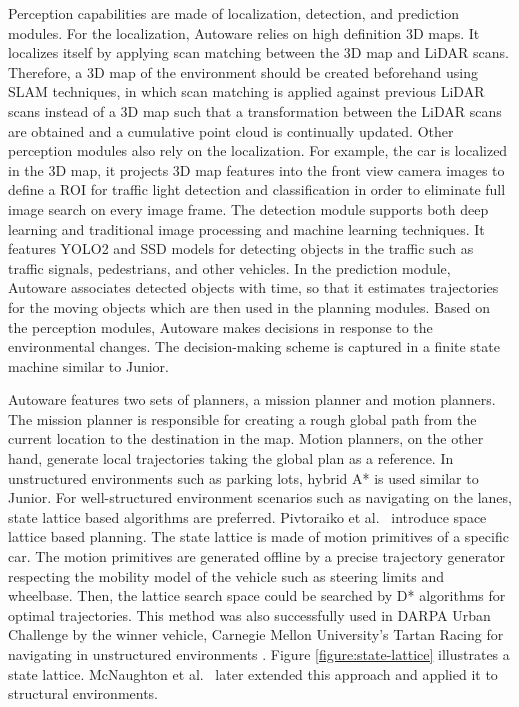 Perception capabilities are made of localization, detection, and prediction
modules. For the localization, Autoware relies on high definition 3D maps. It
localizes itself by applying scan matching between the 3D map and LiDAR scans.
Therefore, a 3D map of the environment should be created beforehand using SLAM
techniques, in which scan matching is applied against previous LiDAR scans
instead of a 3D map such that a transformation between the LiDAR scans are
obtained and a cumulative point cloud is continually updated. Other perception
modules also rely on the localization. For example, the car is localized in
the 3D map, it projects 3D map features into the front view camera images to
define a ROI for traffic light detection and classification in order to
eliminate full image search on every image frame. The detection module supports
both deep learning and traditional image processing and machine learning
techniques. It features YOLO2 \cite{Redmon2016YOLO9000BF} and SSD
\cite{Liu2016SSDSS} models for detecting objects in the traffic such as traffic
signals, pedestrians, and other vehicles. In the prediction module, Autoware
associates detected objects with time, so that it estimates trajectories for
the moving objects which are then used in the planning modules. Based on the
perception modules, Autoware makes decisions in response to the environmental
changes. The decision-making scheme is captured in a finite state machine
similar to Junior.

Autoware features two sets of planners, a mission planner and motion planners.
The mission planner is responsible for creating a rough global path from the
current location to the destination in the map. Motion planners, on the other
hand, generate local trajectories taking the global plan as a reference. In
unstructured environments such as parking lots, hybrid A* is used similar to
Junior. For well-structured environment scenarios such as navigating on the
lanes, state lattice based algorithms are preferred. Pivtoraiko et al.\
\cite{Pivtoraiko2009DifferentiallyCM} introduce space lattice based planning.
The state lattice is made of motion primitives of a specific car. The motion
primitives are generated offline by a precise trajectory generator respecting
the mobility model of the vehicle such as steering limits and wheelbase. Then,
the lattice search space could be searched by D* algorithms for optimal
trajectories. This method was also successfully used in DARPA Urban Challenge
by the winner vehicle, Carnegie Mellon University's Tartan Racing for
navigating in unstructured environments \cite{Urmson2007TartanRA}. Figure
\ref{figure:state-lattice} illustrates a state lattice. McNaughton et al.\
\cite{McNaughton2011MotionPF} later extended this approach and applied it to
structural environments.

